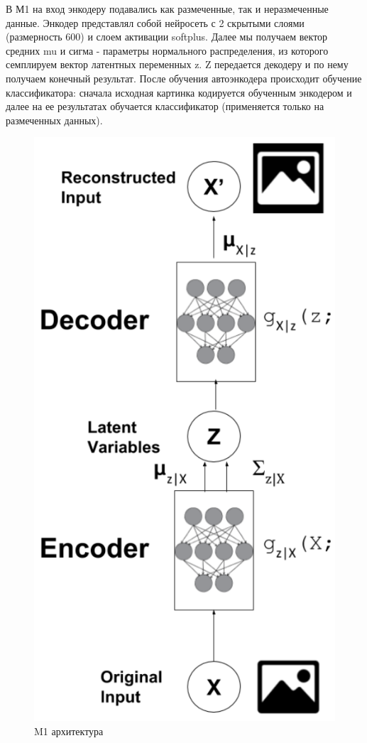 \documentclass{article}
\begin{document}
В М1 на вход энкодеру подавались как размеченные, так и неразмеченные данные. Энкодер представлял собой нейросеть с 2 скрытыми слоями (размерность 600) и слоем активации softplus. Далее мы получаем вектор средних mu и сигма - параметры нормального распределения, из которого семплируем вектор латентных переменных z. Z передается декодеру и по нему получаем конечный результат. После обучения автоэнкодера происходит обучение классификатора: сначала исходная картинка кодируется обученным энкодером и далее на ее результатах обучается классификатор (применяется только на размеченных данных).
\begin{figure}[htbp]
    \centering
    \includegraphics[scale=0.4]{m1}
    \caption{M1 архитектура}
\end{figure}
\end{document}
